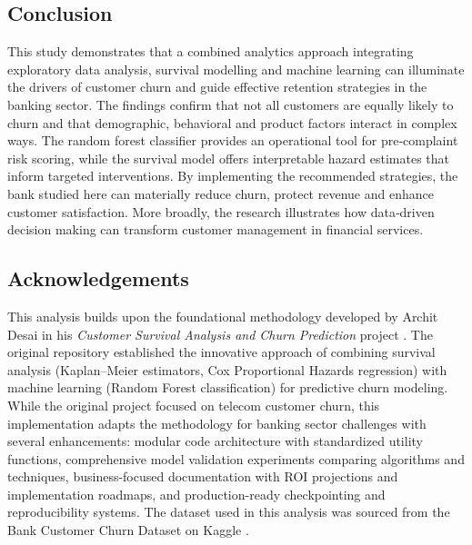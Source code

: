 \documentclass[12pt]{article}
\begin{document}
\subsection{Conclusion}
This study demonstrates that a combined analytics approach integrating exploratory data analysis, survival modelling and machine learning can illuminate the drivers of customer churn and guide effective retention strategies in the banking sector.  The findings confirm that not all customers are equally likely to churn and that demographic, behavioral and product factors interact in complex ways.  The random forest classifier provides an operational tool for pre‑complaint risk scoring, while the survival model offers interpretable hazard estimates that inform targeted interventions.  By implementing the recommended strategies, the bank studied here can materially reduce churn, protect revenue and enhance customer satisfaction.  More broadly, the research illustrates how data‑driven decision making can transform customer management in financial services.

\subsection{Acknowledgements}
This analysis builds upon the foundational methodology developed by Archit Desai in his \emph{Customer Survival Analysis and Churn Prediction} project \citep{desai_customer_survival}.  The original repository established the innovative approach of combining survival analysis (Kaplan–Meier estimators, Cox Proportional Hazards regression) with machine learning (Random Forest classification) for predictive churn modeling.  While the original project focused on telecom customer churn, this implementation adapts the methodology for banking sector challenges with several enhancements: modular code architecture with standardized utility functions, comprehensive model validation experiments comparing algorithms and techniques, business-focused documentation with ROI projections and implementation roadmaps, and production-ready checkpointing and reproducibility systems.  The dataset used in this analysis was sourced from the Bank Customer Churn Dataset on Kaggle \citep{kollipara2022bank}.

\newpage


\end{document}
